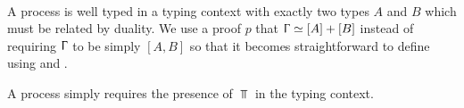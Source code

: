 \begin{AgdaAlign}
\begin{code}%
\>[0]\AgdaSpace{}%
\AgdaSpace{}%
\AgdaSymbol{:}\AgdaSpace{}%
\AgdaSpace{}%
\AgdaSpace{}%
\AgdaSpace{}%
\<%
\\
\>[0][@{}l@{\AgdaIndent{0}}]%
\>[3]%
\>[13]\AgdaSymbol{:}\AgdaSpace{}%
\AgdaSpace{}%
\AgdaSpace{}%
\AgdaSymbol{\}}\AgdaSpace{}%
\AgdaSymbol{(}\AgdaSpace{}%
\AgdaSymbol{:}\AgdaSpace{}%
\AgdaSpace{}%
\AgdaSpace{}%
\AgdaSymbol{)}\AgdaSpace{}%
\AgdaSymbol{(}\AgdaSpace{}%
\AgdaSymbol{:}\AgdaSpace{}%
\AgdaSpace{}%
\AgdaSpace{}%
\AgdaOperator{\AgdaFunction{[}}\AgdaSpace{}%
\AgdaSpace{}%
\AgdaOperator{\AgdaFunction{]}}\AgdaSpace{}%
\AgdaOperator{\AgdaDatatype{+}}\AgdaSpace{}%
\AgdaOperator{\AgdaFunction{[}}\AgdaSpace{}%
\AgdaSpace{}%
\AgdaOperator{\AgdaFunction{]}}\AgdaSymbol{)}\AgdaSpace{}%
\AgdaSpace{}%
\AgdaSpace{}%
\<%
\end{code}

A  process is well typed in a typing context with
exactly two types $A$ and $B$ which must be related by duality. We use a proof
$p$ that $\Upgamma \simeq [A] + [B]$ instead of requiring $\Upgamma$ to be
simply $[A,B]$ so that it becomes straightforward to define \SLink using
 and .

\begin{code}%
%
\>[3]%
\>[13]\AgdaSymbol{:}\AgdaSpace{}%
\AgdaSpace{}%
\AgdaSymbol{\}}\AgdaSpace{}%
\AgdaSymbol{(}\AgdaSpace{}%
\AgdaSymbol{:}\AgdaSpace{}%
\AgdaSpace{}%
\AgdaSpace{}%
\AgdaSpace{}%
\AgdaOperator{\AgdaFunction{,}}\AgdaSpace{}%
\AgdaSymbol{)}\AgdaSpace{}%
\AgdaSpace{}%
\AgdaSpace{}%
\<%
\end{code}

A  process simply requires the presence of $\Top$
in the typing context.

\begin{code}%
%
\>[3]%
\>[13]\AgdaSymbol{:}\AgdaSpace{}%
\AgdaSpace{}%
\AgdaOperator{\AgdaFunction{[}}\AgdaSpace{}%
\AgdaSpace{}%
\AgdaOperator{\AgdaFunction{]}}\<%
\end{code}


\end{AgdaAlign}
